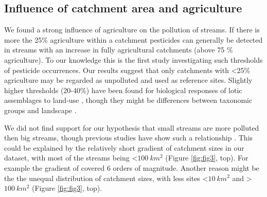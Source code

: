 \documentclass[journal=esthag,manuscript=article]{achemso}
\begin{document}
\subsection{Influence of catchment area and agriculture}
We found a strong influence of agriculture on the pollution of streams.
If there is more the 25\% agriculture within a catchment pesticides can generally be detected in streams with an increase in fully agricultural catchments (above 75 \% agriculture).
To our knowledge this is the first study  investigating such thresholds of pesticide occurrences.
Our results suggest that only catchments with \textless 25\% agriculture may be regarded as unpolluted and used as reference sites.
Slightly higher thresholds (20-40\%) have been found for biological responses of lotic assemblages to land-use \citep{waite_agricultural_2014, feld_response_2013}, though they might be differences between taxonomic groups and landscape \citep{feld_response_2013}.

We did not find support for our hypothesis that small streams are more polluted then big streams, though previous studies have show such a relationship \citep{schulz_field_2004,stehle_pesticide_2015,knauer_pesticides_2016}.
This could be explained by the relatively short gradient of catchment sizes in our dataset, with most of the streams being \textless $100~km^2$ (Figure \ref{fig:fig3}, top).
For example the gradient of \citet{schulz_field_2004} covered 6 orders of magnitude.
Another reason might be the the unequal distribution of catchment sizes, with less sites \textless $10~km^2$ and \textgreater $100~km^2$ (Figure \ref{fig:fig3}, top).
\end{document}
